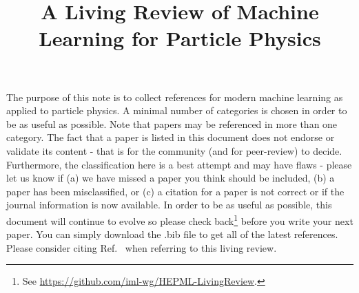 \documentclass[12pt,letterpaper]{article}
\title{\boldmath A Living Review of Machine \\ Learning for Particle Physics}
\begin{document}
\maketitle

The purpose of this note is to collect references for modern machine learning as applied to particle physics.  A minimal number of categories is chosen in order to be as useful as possible.  Note that papers may be referenced in more than one category.  The fact that a paper is listed in this document does not endorse or validate its content - that is for the community (and for peer-review) to decide.  Furthermore, the classification here is a best attempt and may have flaws - please let us know if (a) we have missed a paper you think should be included, (b) a paper has been misclassified, or (c) a citation for a paper is not correct or if the journal information is now available.  In order to be as useful as possible, this document will continue to evolve so please check back\footnote{See \href{https://github.com/iml-wg/HEPML-LivingReview}{https://github.com/iml-wg/HEPML-LivingReview}.} before you write your next paper.  You can simply download the .bib file to get all of the latest references.  Please consider citing Ref.~\cite{Feickert:2021ajf} when referring to this living review.
\end{document}
